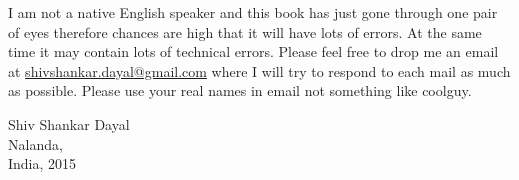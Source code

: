 I am not a native English speaker and this book has just gone through one pair
of eyes therefore chances are high that it will have lots of errors. At the
same time it may contain lots of technical errors. Please feel free to drop me
an email at
\href{mailto:shivshankar.dayal@gmail.com}{shivshankar.dayal@gmail.com} where I
will try to respond to each mail as
much as possible. Please use your real names in email not something like
coolguy.
\begin{flushright}
Shiv Shankar Dayal\\
Nalanda,\\
India, 2015
\end{flushright}
